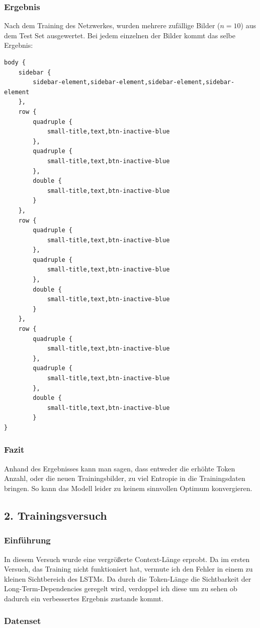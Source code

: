\documentclass[pdftex,a4paper,halfparskip, article]{scrartcl}
\begin{document}
\subsubsection*{Ergebnis}

Nach dem Training des Netzwerkes, wurden mehrere zufällige Bilder ($n=10$) aus dem Test Set ausgewertet. Bei jedem einzelnen der Bilder kommt das selbe Ergebnis:

\begin{verbatim}
body {
	sidebar {
		sidebar-element,sidebar-element,sidebar-element,sidebar-element
	},
	row {
		quadruple {
			small-title,text,btn-inactive-blue
		},
		quadruple {
			small-title,text,btn-inactive-blue
		},
		double {
			small-title,text,btn-inactive-blue
		}
	},
	row {
		quadruple {
			small-title,text,btn-inactive-blue
		},
		quadruple {
			small-title,text,btn-inactive-blue
		},
		double {
			small-title,text,btn-inactive-blue
		}
	},
	row {
		quadruple {
			small-title,text,btn-inactive-blue
		},
		quadruple {
			small-title,text,btn-inactive-blue
		},
		double {
			small-title,text,btn-inactive-blue
		}
}
\end{verbatim}

\subsubsection*{Fazit}

Anhand des Ergebnisses kann man sagen, dass entweder die erhöhte Token Anzahl, oder die neuen Trainingsbilder, zu viel Entropie in die Trainingsdaten bringen. So kann das Modell leider zu keinem sinnvollen Optimum konvergieren. 


\subsection{2. Trainingsversuch}

\subsubsection*{Einführung}

In diesem Versuch wurde eine vergrößerte Context-Länge erprobt. Da im ersten Versuch, das Training nicht funktioniert hat, vermute ich den Fehler in einem zu kleinen Sichtbereich des LSTMs. Da durch die Token-Länge die Sichtbarkeit der Long-Term-Dependencies geregelt wird, verdoppel ich diese um zu sehen ob dadurch ein verbessertes Ergebnis zustande kommt.

\subsubsection*{Datenset}
\end{document}
